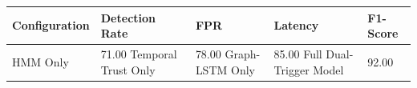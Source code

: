 \begin{tabular}{lllll}
\toprule
Configuration & Detection Rate & FPR & Latency & F1-Score \\
\midrule
HMM Only & 71.00%
Temporal Trust Only & 78.00%
Graph-LSTM Only & 85.00%
Full Dual-Trigger Model & 92.00%
\bottomrule
\end{tabular}
